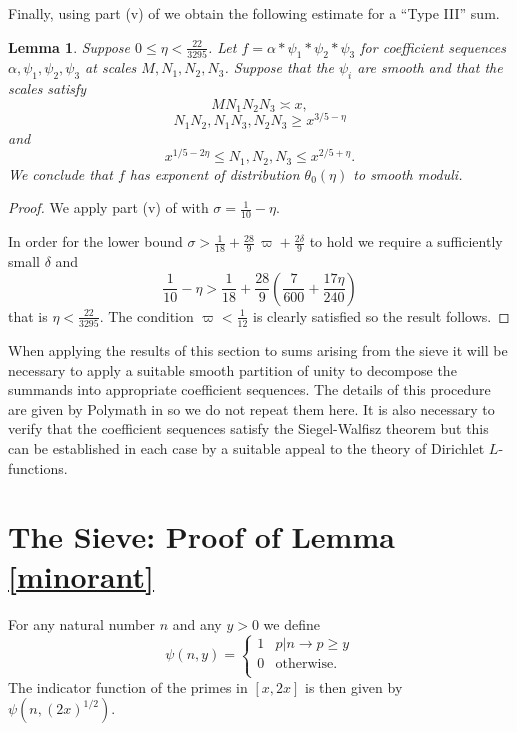 \documentclass[12pt]{amsart}
\theoremstyle{plain}
\newtheorem{lem}{Lemma}
\theoremstyle{definition}
\numberwithin{equation}{section}
\def \a{\alpha} \def \b{\beta} \def \d{\delta} \def \e{\varepsilon} \def \g{\gamma} \def \k{\kappa} \def \l{\lambda} \def \s{\sigma} \def \t{\theta} \def \z{\zeta}
\begin{document}
Finally, using part (v) of \cite[Theorem 2.8]{polymath8a} we obtain the following estimate for a ``Type III'' sum.

\begin{lem}\label{type3}
Suppose $0\leq \eta<\frac{22}{3295}$.  Let $f=\a*\psi_1*\psi_2*\psi_3$ for coefficient sequences $\alpha,\psi_1,\psi_2,\psi_3$ at scales $M,N_1,N_2,N_3$.  Suppose that the $\psi_i$ are smooth and that the scales satisfy 
$$MN_1N_2N_3\asymp x,$$
$$N_1N_2,N_1N_3,N_2N_3\geq x^{3/5-\eta}$$
and
$$x^{1/5-2\eta}\leq N_1,N_2,N_3\leq x^{2/5+\eta}.$$
We conclude that $f$ has exponent of distribution $\theta_0(\eta)$ to smooth moduli.  
\end{lem}

\begin{proof}
We apply part (v) of \cite[Theorem 2.8]{polymath8a} with $\sigma=\frac{1}{10}-\eta$. 

In order for the lower bound 
$\s > \frac 1{18} + \frac{28}9\, \varpi+\frac{2\delta}{9}$ 
to hold we require a sufficiently small $\delta$ and 
$$\frac{1}{10}-\eta> \frac 1{18} + \frac{28}9\left(\frac{7}{600}+\frac{17\eta}{240}\right)$$
that is $\eta<\frac{22}{3295}$.  The condition $\varpi<\frac{1}{12}$ is clearly satisfied so the result follows.  
\end{proof}

When applying the results of this section to sums arising from the sieve it will be necessary to apply a suitable smooth partition of unity to decompose the summands into appropriate coefficient sequences.  The details of this procedure are given by Polymath in \cite[Section 3]{polymath8a} so we do not repeat them here.  It is also necessary to verify that the coefficient sequences satisfy the Siegel-Walfisz theorem but this can be established in each case by a suitable appeal to the theory of Dirichlet $L$-functions.
 

\section{The Sieve: Proof of Lemma \ref{minorant}}

For any natural number $n$ and any $y>0$ we define 
$$\psi(n,y)=\begin{cases}
1 & p|n\rightarrow p\geq y\\
0 & \text{otherwise}.\\
\end{cases}$$  
The indicator function of the primes in $[x,2x]$ is then given by\\ 
$\psi(n,(2x)^{1/2})$. 
\end{document}
